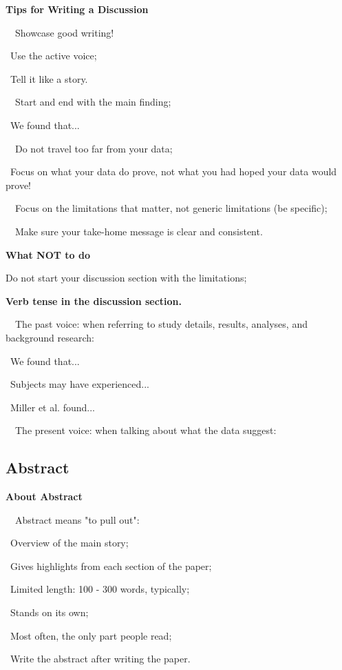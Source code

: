 \documentclass[a4paper, 12pt]{article}
\begin{document}
\newpage\textbf{Tips for Writing a Discussion}
\par\ \textbullet\ Showcase good writing!
\par\quad\textopenbullet\ Use the active voice;
\par\quad\textopenbullet\ Tell it like a story.
\par\ \textbullet\ Start and end with the main finding;
\par\quad\textopenbullet\ We found that...
\par\ \textbullet\ Do not travel too far from your data;
\par\quad\textopenbullet\ Focus on what your data do prove, not what you had hoped your data would prove!
\par\ \textbullet\ Focus on the limitations that matter, not generic limitations (be specific);
\par\ \textbullet\ Make sure your take-home message is clear and consistent.

\textbf{What NOT to do}
\par Do not start your discussion section with the limitations;

\textbf{Verb tense in the discussion section.}
\par\ \textbullet\ The past voice: when referring to study details, results, analyses, and background research:
\par\quad\textopenbullet\ We found that...
\par\quad\textopenbullet\ Subjects may have experienced...
\par\quad\textopenbullet\ Miller et al. found...
\par\ \textbullet\ The present voice: when talking about what the data suggest:

\newpage\subsection{Abstract}

\textbf{About Abstract}
\par\ \textbullet\ Abstract means "to pull out":
\par\quad\textopenbullet\ Overview of the main story;
\par\quad\textopenbullet\ Gives highlights from each section of the paper;
\par\quad\textopenbullet\ Limited length: 100 - 300 words, typically;
\par\quad\textopenbullet\ Stands on its own;
\par\quad\textopenbullet\ Most often, the only part people read;
\par\quad\textopenbullet\ Write the abstract after writing the paper.
\end{document}
